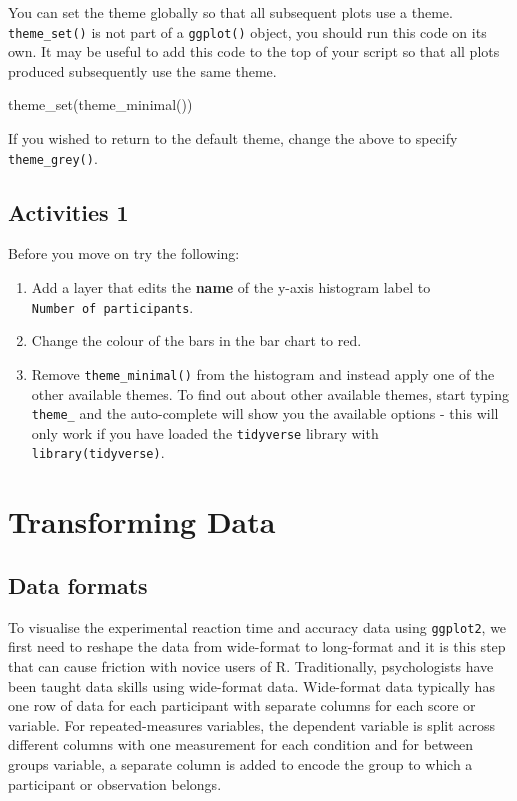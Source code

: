 \documentclass[
  english,
  doc,floatsintext]{apa6}
\newenvironment{Shaded}{\begin{snugshade}}{\end{snugshade}}
\newcommand{\FunctionTok}[1]{\textcolor[rgb]{0.00,0.00,0.00}{#1}}
\newcommand{\NormalTok}[1]{#1}
\begin{document}
You can set the theme globally so that all subsequent plots use a theme. \texttt{theme\_set()} is not part of a \texttt{ggplot()} object, you should run this code on its own. It may be useful to add this code to the top of your script so that all plots produced subsequently use the same theme.

\begin{Shaded}
\begin{Highlighting}[]
\FunctionTok{theme\_set}\NormalTok{(}\FunctionTok{theme\_minimal}\NormalTok{())}
\end{Highlighting}
\end{Shaded}

If you wished to return to the default theme, change the above to specify \texttt{theme\_grey()}.

\hypertarget{activities-1}{%
\subsection{Activities 1}\label{activities-1}}

Before you move on try the following:

\begin{enumerate}
\def\labelenumi{\arabic{enumi}.}
\item
  Add a layer that edits the \textbf{name} of the y-axis histogram label to \texttt{Number\ of\ participants}.
\item
  Change the colour of the bars in the bar chart to red.
\item
  Remove \texttt{theme\_minimal()} from the histogram and instead apply one of the other available themes. To find out about other available themes, start typing \texttt{theme\_} and the auto-complete will show you the available options - this will only work if you have loaded the \texttt{tidyverse} library with \texttt{library(tidyverse)}.
\end{enumerate}

\hypertarget{transforming-data}{%
\section{Transforming Data}\label{transforming-data}}

\hypertarget{data-formats}{%
\subsection{Data formats}\label{data-formats}}

To visualise the experimental reaction time and accuracy data using \texttt{ggplot2}, we first need to reshape the data from wide-format to long-format and it is this step that can cause friction with novice users of R. Traditionally, psychologists have been taught data skills using wide-format data. Wide-format data typically has one row of data for each participant with separate columns for each score or variable. For repeated-measures variables, the dependent variable is split across different columns with one measurement for each condition and for between groups variable, a separate column is added to encode the group to which a participant or observation belongs.
\end{document}

